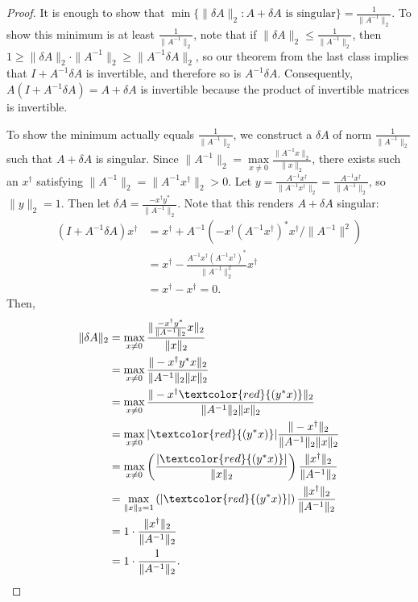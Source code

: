 \documentclass{ximera}
\begin{document}
\begin{proof}
    It is enough to show that $\min\{\|\delta A\|_2 : A+ \delta A \text{ is singular}\} = \frac{1}{\|A^{-1}\|_2}$.
    To show this minimum is at least $\frac{1}{\|A^{-1}\|_2}$, note that if $\|\delta A\|_2 \leq \frac{1}{\|A^{-1}\|_2}$, then $1 \geq \|\delta A\|_2 \cdot \|A^{-1}\|_2 \geq \|A^{-1}\delta A\|_2$, so our theorem from the last class implies that $I+A^{-1}\delta A$ is invertible, and therefore so is $A^{-1}\delta A$.  Consequently, $A(I+A^{-1}\delta A) = A+ \delta A$ is invertible because the product of invertible matrices is invertible.
    
    To show the minimum actually equals $\frac{1}{\|A^{-1}\|_2}$, we construct a $\delta A$ of norm $\frac{1}{\|A^{-1}\|_2}$ such that $A + \delta A$ is singular.  Since $\|A^{-1}\|_2 = \max\limits_{x\neq 0} \frac{\|A^{-1}x\|_2}{\|x\|_2}$, there exists such an $x^\dagger$ satisfying $\|A^{-1}\|_2 = \|A^{-1}x^\dagger\|_2 >0$.  Let $ y = \frac{A^{-1}x^\dagger}{\|A^{-1}x^\dagger\|_2} = \frac{A^{-1}x^\dagger}{\|A^{-1}\|_2}$, so $\|y\|_2 = 1$.  Then let $\delta A = \frac{-x^\dagger y^*}{\|A^{-1}\|_2}$.  
    Note that this renders $A+ \delta A$ singular:
    \begin{align*}
    (I+A^{-1}\delta A)x^\dagger &= x^\dagger + A^{-1}( -x^\dagger (A^{-1}x^\dagger)^*x^\dagger/\|A^{-1}\|^2)  \\
    &= x^\dagger - \frac{A^{-1}x^\dagger(A^{-1}x^\dagger)^*}{\|A^{-1}\|_2^2}x^\dagger
    \\
    &= x^\dagger - x^\dagger = 0.
    \end{align*}
    Then,
    \begin{align*}
        \|\delta A\|_2 &= \max\limits_{x\neq 0} \frac{\|\frac{-x^\dagger y^*}{\|A^{-1}\|_2} x\|_2}{\|x\|_2}
        \\
        &= \max\limits_{x\neq 0} \frac{\|-x^\dagger y^*x\|_2}{\|A^{-1}\|_2\|x\|_2}
        \\
        &= \max\limits_{x\neq 0} \frac{\|-x^\dagger \textcolor{red}{(y^*x)}\|_2}{\|A^{-1}\|_2\|x\|_2}
        \\
        &= \max\limits_{x\neq 0} |\textcolor{red}{(y^*x)}| \frac{\|-x^\dagger \|_2}{\|A^{-1}\|_2\|x\|_2}
        \\
        &= 
        \max\limits_{x\neq 0} \left(\frac{|\textcolor{red}{(y^*x)}|}{\|x\|_2} \right)\frac{\|x^\dagger \|_2}{\|A^{-1}\|_2}
        \\
        &= \max\limits_{\|x\|_2 = 1} \left(|\textcolor{red}{(y^*x)}|\right)\frac{\|x^\dagger \|_2}{\|A^{-1}\|_2}
        \\
        &= 1\cdot \frac{\|x^\dagger\|_2}{\|A^{-1}\|_2}
        \\
        &= 1\cdot \frac{1}{\|A^{-1}\|_2}.
    \end{align*}
\end{proof}
\end{document}
